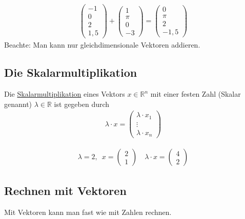 \begin{align*}
	\begin{pmatrix} -1 \\ 0 \\ 2 \\ 1,5 \end{pmatrix} + \begin{pmatrix} 1 \\ \pi \\ 0 \\ -3 \end{pmatrix} = \begin{pmatrix} 0 \\ \pi \\ 2 \\ -1,5 \end{pmatrix}
\end{align*}
Beachte: Man kann nur gleichdimensionale Vektoren addieren.

\subsection{Die Skalarmultiplikation}
Die \underline{Skalarmultiplikation} eines Vektors $x \in \mathbb{R}^n$ mit einer festen Zahl (Skalar genannt) $\lambda \in \mathbb{R}$ ist gegeben durch
\begin{align*}
	\lambda \cdot x = \begin{pmatrix} \lambda \cdot x_1 \\ \vdots \\ \lambda \cdot x_n \end{pmatrix}
\end{align*}

\begin{align*}
	\lambda = 2, \enspace x = \begin{pmatrix}2 \\ 1\end{pmatrix} \quad \lambda \cdot x = \begin{pmatrix}4 \\ 2\end{pmatrix}
\end{align*}

\subsection{Rechnen mit Vektoren}
Mit Vektoren kann man fast wie mit Zahlen rechnen.

